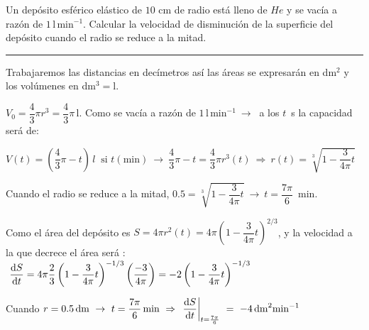 \vspace{1cm}
\begin{miejercicio}

Un depósito esférico elástico de $10$  cm  de radio	 está lleno de $He$ y se vacía a razón de $1\, \mathrm{l} \, \mathrm{min}^{-1}$. Calcular la velocidad de disminución de la superficie del depósito cuando el radio se reduce a la mitad.

\color{teal!80}
\rule{200pt}{0.2pt}
\color{black}
\vspace{5mm}

Trabajaremos las distancias en decímetros así las áreas se expresarán en dm$^2$ y los volúmenes en dm$^3=$l.

\vspace{3mm}$V_0=\dfrac 4 3 \pi r^3 =  \dfrac 4 3 \pi\,  $l.  Como se vacía a razón de $1\, \mathrm{l}\, \mathrm{min}^{-1} \ \to \ $ a los $t\, $ s la capacidad será de:

\vspace{3mm}$V(t)= \left( \dfrac 4 3 \pi - t \right) \, l \ \text{ si } t(\text{min})\ \to \  \dfrac 4 3 \pi - t = \dfrac 4 3 \pi r^3(t) \ \Rightarrow \ r(t)=\sqrt[3]{1-\dfrac 3 {4 \pi}  t}$ 

\vspace{3mm}Cuando el radio se reduce a la mitad, $0.5=\sqrt[3]{1-\dfrac 3 {4 \pi}  t} \ \to \ t=\dfrac{7\pi}{6} \,$ min.

\vspace{3mm} Como el área del depósito es $S=4\pi r^2(t)=4\pi \left( 1-\dfrac 3 {4 \pi}  t \right)^{2/3}$, y la velocidad a la que decrece el área será : $\ \displaystyle \dv{S}{t}=4\pi \dfrac 2 3 \left( 1-\dfrac 3 {4 \pi}  t \right)^{-1/3} \left( \dfrac{-3}{4\pi} \right)=-2 \left( 1-\dfrac 3 {4 \pi}  t \right)^{-1/3}$

\vspace{3mm} Cuando $r=0.5 \, \mathrm{dm} \ \to \ t=\dfrac{7\pi}{6} \, \mathrm{min} \ \Rightarrow \ \displaystyle \eval{\dv{S}{t}}_{t=\frac{7\pi}{6}}\ = \ -4 \, \mathrm{dm}^2\mathrm{min}^{-1}$

\end{miejercicio}







